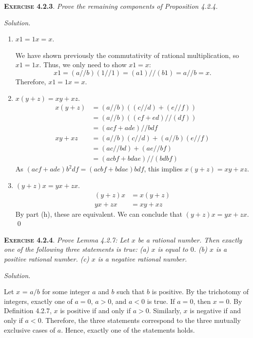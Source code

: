 \documentclass[12pt]{article}
\theoremstyle{remark}
\newenvironment{exer}[2]{
    \noindent \setlength{\parskip}{1em}%
    \textsc{\textbf{Exercise #1}}. \textit{#2} \par
    \noindent \textit{Solution.} %
}{\bigskip}
\begin{document}
\begin{exer}{4.2.3}{
     Prove the remaining components of Proposition 4.2.4.
}
\begin{enumerate}[topsep=0mm,label=(\alph*)]
        \item $x1 = 1x = x$.
        
            We have shown previously the commutativity of rational multiplication, so $x1 = 1x$.
            Thus, we only need to show $x1 = x$:
            \[
                x1 = (a // b)(1 // 1) = (a1) // (b1) = a // b = x.
            \]
            Therefore, $x1 = 1x = x$.
            
        \item $x(y + z) = xy + xz$.
            \begin{align*}
                x(y + z)
                &= (a // b)((c // d) + (e // f)) \\
                &= (a // b)((cf + ed) // (df)) \\
                &= (acf + ade) // bdf \\
                xy + xz
                &= (a // b)(c // d) + (a // b)(e // f) \\
                &= (ac // bd) + (ae // bf) \\
                &= (acbf + bdae) // (bdbf)
            \end{align*}
            As $(acf + ade) b^2 df = (acbf + bdae)bdf$, this implies $x(y + z) = xy + xz$.
            
        \item $(y + z)x = yx + zx$.
            \begin{align*}
                (y + z)x
                &= x(y + z) \\
                yx + zx
                &= xy + xz
            \end{align*}
            By part (h), these are equivalent. We can conclude that $(y + z)x = yx + zx$. \qed
    \end{enumerate}
\end{exer}


\begin{exer}{4.2.4}{
    Prove Lemma 4.2.7:
    Let $x$ be a rational number.
    Then exactly one of the following three statements is true:
    (a) $x$ is equal to $0$.
    (b) $x$ is a positive rational number.
    (c) $x$ is a negative rational number.
}
    Let $x$ = $a / b$ for some integer $a$ and $b$ such that $b$ is positive.
    By the trichotomy of integers, exactly one of $a = 0$, $a > 0$, and $a < 0$ is true.
    If $a = 0$, then $x = 0$.
    By Definition 4.2.7, $x$ is positive if and only if $a > 0$.
    Similarly, $x$ is negative if and only if $a < 0$.
    Therefore, the three statements correspond to the three mutually exclusive cases of $a$.
    Hence, exactly one of the statements holds.
\end{exer}
\end{document}
